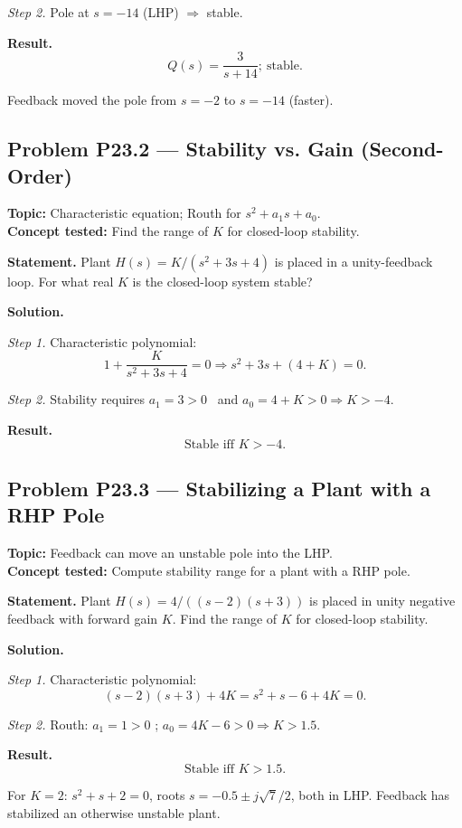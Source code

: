 \documentclass[11pt]{article}
\begin{document}
\textit{Step 2.} Pole at $s=-14$ (LHP) $\Rightarrow$ stable.

\textbf{Result.}
\[
\boxed{\,Q(s) = \frac{3}{s+14};\ \text{stable.}\,}
\]

Feedback moved the pole from $s=-2$ to $s=-14$ (faster).

\subsection{Problem P23.2 --- Stability vs. Gain (Second-Order)}
\textbf{Topic:} Characteristic equation; Routh for $s^{2}+a_{1}s+a_{0}$.\\
\textbf{Concept tested:} Find the range of $K$ for closed-loop stability.

\textbf{Statement.} Plant $H(s) = K/(s^{2}+3s+4)$ is placed in a unity-feedback
loop. For what real $K$ is the closed-loop system stable?

\textbf{Solution.}

\textit{Step 1.} Characteristic polynomial:
\[
1+\frac{K}{s^{2}+3s+4} = 0\Rightarrow s^{2}+3s+(4+K) = 0.
\]

\textit{Step 2.} Stability requires $a_{1}=3>0$ \checkmark\ and
$a_{0}=4+K>0\Rightarrow K>-4$.

\textbf{Result.}
\[
\boxed{\,\text{Stable iff }K>-4.\,}
\]

\subsection{Problem P23.3 --- Stabilizing a Plant with a RHP Pole}
\textbf{Topic:} Feedback can move an unstable pole into the LHP.\\
\textbf{Concept tested:} Compute stability range for a plant with a RHP pole.

\textbf{Statement.} Plant $H(s)=4/((s-2)(s+3))$ is placed in unity negative
feedback with forward gain $K$. Find the range of $K$ for closed-loop stability.

\textbf{Solution.}

\textit{Step 1.} Characteristic polynomial:
\[
(s-2)(s+3)+4K = s^{2}+s-6+4K = 0.
\]

\textit{Step 2.} Routh: $a_{1}=1>0$ \checkmark; $a_{0}=4K-6>0\Rightarrow K>1.5$.

\textbf{Result.}
\[
\boxed{\,\text{Stable iff }K>1.5.\,}
\]

For $K=2$: $s^{2}+s+2=0$, roots $s=-0.5\pm j\sqrt{7}/2$, both in LHP.
Feedback has stabilized an otherwise unstable plant.
\end{document}
